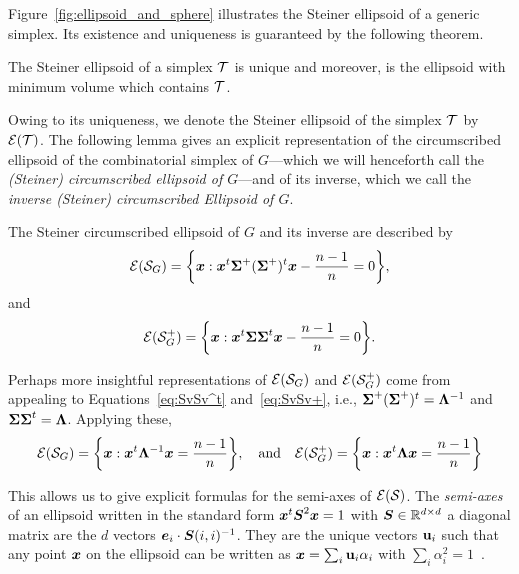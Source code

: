 Figure~\ref{fig:ellipsoid_and_sphere} illustrates  the Steiner ellipsoid of a generic simplex. Its existence  and uniqueness is guaranteed by the following theorem. 

\begin{theorem}
The Steiner ellipsoid of a simplex $\mathcal{T}$ is unique and moreover, is the ellipsoid with minimum volume which contains $\mathcal{T}$. 
\end{theorem}

Owing to its uniqueness, we denote the Steiner ellipsoid of the simplex $\mathcal{T}$ by $\mathcal{E}(\mathcal{T})$. The following lemma gives an explicit representation of the circumscribed ellipsoid of the combinatorial simplex of $G$---which we will  henceforth call the \emph{(Steiner) circumscribed ellipsoid of $G$}---and of its inverse, which we call the \emph{inverse (Steiner) circumscribed Ellipsoid of $G$}. 

\begin{lemma}
	\label{lem:El(S)}
The Steiner circumscribed ellipsoid  of $G$ and its inverse  are described by 
\begin{equation}
\label{eq:steinerE}
    \mathcal{E}(\mathcal{S}_G) = \bigg\{\vb*{x}: \vb*{x}^t \boldsymbol{\Sigma}^+(\boldsymbol{\Sigma}^+)^t \vb*{x} - \frac{n-1}{n}=0\bigg\},
\end{equation}
and 
\begin{equation}
\label{eq:steinerE_inverse}
\mathcal{E}(\mathcal{S}^+_G) = \bigg\{\vb*{x}: \vb*{x}^t \boldsymbol{\Sigma}\boldsymbol{\Sigma}^t \vb*{x} - \frac{n-1}{n}=0\bigg\}.
\end{equation}
\end{lemma}


 Perhaps more insightful representations of $\mathcal{E}(\mathcal{S}_G)$ and $\mathcal{E}(\mathcal{S}_G^+)$ come from appealing to Equations~\eqref{eq:SvSv^t} and~\eqref{eq:SvSv+}, i.e., $\boldsymbol{\Sigma}^+(\boldsymbol{\Sigma}^+)^t = \vb{\Lambda}^{-1}$ and $\boldsymbol{\Sigma}\boldsymbol{\Sigma}^t=\vb{\Lambda}$.  Applying  these,
\begin{equation}
\label{eq:steinerE2}
    \mathcal{E}(\mathcal{S}_G) = \bigg\{\vb*{x}:\vb*{x}^t \vb{\Lambda}^{-1}\vb*{x} = \frac{n-1}{n}\bigg\},\quad\text{and}\quad \mathcal{E}(\mathcal{S}_G^+) = \bigg\{\vb*{x}:\vb*{x}^t \vb{\Lambda}\vb*{x} = \frac{n-1}{n}\bigg\}
\end{equation}

This allows us to give explicit formulas for the semi-axes of $\mathcal{E}(\mathcal{S})$.
 The \emph{semi-axes} of an ellipsoid written in the standard form $\vb*{x}^t \vb*{S}^2\vb*{x}=1$ with $\vb*{S}\in\mathbb{R}^{d\times d}$ a diagonal matrix are the $d$ vectors $\vb*{e}_i\cdot \vb*{S}(i,i)^{-1}$. They are the unique vectors $\vb{u}_i$ such that any  point $\vb*{x}$ on the ellipsoid can be written as $\vb*{x}=\sum_i \vb{u}_i\alpha_i$ with  $\sum_i\alpha_i^2=1$~\cite{devriendt2018simplex}. 
 
